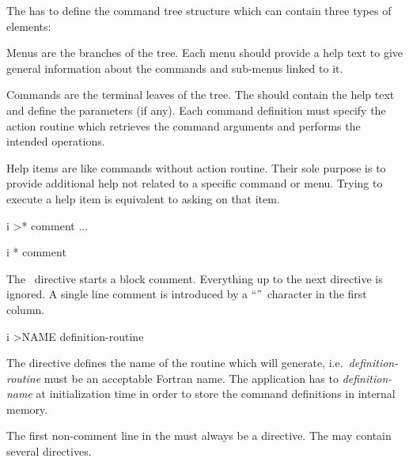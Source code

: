 The \CDF{} has to define the command tree structure which can contain
three types of elements: 
\begin{UL}

\item
Menus 
are the branches of the tree.
Each menu should provide a help text to give general information
about the commands and sub-menus linked to it.

\item
Commands 
are the terminal leaves of the tree.
The \CDF{} should contain the help text and define the parameters 
(if any).
Each command definition must specify the action routine 
which retrieves the command arguments and performs the intended operations.

\item
Help items  are like commands without
action routine. 
Their sole purpose is to provide additional help not related to a
specific command or menu.
Trying to execute a help item is equivalent to asking  on that item.

\end{UL}

\begin{Gray}{i}
>* comment
   ...
\end{Gray}
\begin{Gray}{i}
*  comment
\end{Gray}
The \Lit{>*}~directive starts a block comment.
Everything up to the next \CDF{} directive is ignored.
A single line comment is introduced by a ``\Lit{*}''~character in the
first column. 


\begin{Gray}{i}
>NAME  definition-routine
\end{Gray}
The  directive defines the name of the routine which
\KUIPC{} will generate, i.e.\ \textsl{definition-routine} must be an acceptable
Fortran  name.
The application has to \textsl{definition-name} at initialization time
in order to store the command definitions in internal memory.


The first non-comment line in the \CDF{} must always be a 
directive. 
The \CDF{} may contain several  directives.

